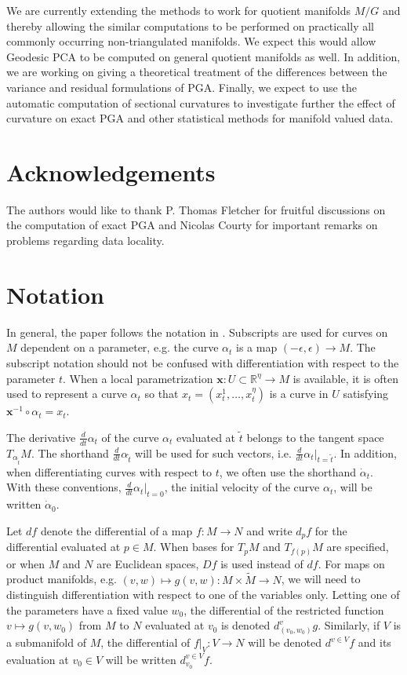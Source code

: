 \documentclass[final]{svjour3}
\newcommand{\RR}{\mathbb{R}}
\newcommand{\df}[2]{\tfrac{d}{d#2} #1}
\newcommand{\tm}{d}
\newcommand{\tmp}[1]{\tm^{#1}}
\newcommand{\param}[1]{\mathbf{#1}}
\begin{document}
We are currently extending the methods to work for quotient manifolds
$M/G$ and thereby allowing the similar computations to be performed on practically all
commonly occurring non-triangulated manifolds.
We expect this would allow Geodesic PCA to be computed on general 
quotient manifolds as well.
In addition, we are working on giving a theoretical treatment of the differences
between the variance and residual formulations of PGA. Finally, we
expect to use the automatic computation of sectional curvatures to investigate
further the effect of curvature on exact PGA and other 
statistical methods for manifold valued data.


\section*{Acknowledgements}
The authors would like to thank P. Thomas Fletcher for fruitful discussions on
the computation of exact PGA and Nicolas Courty for important remarks on
problems regarding data locality. 

\appendix

\section{Notation}
\label{app:notation}
In general, the paper follows the notation in \cite{do_carmo_riemannian_1992}.
Subscripts are used for curves on $M$ dependent on a parameter,
e.g. the curve $\alpha_t$ is a map $(-\epsilon,\epsilon)\rightarrow M$.
The subscript notation should 
not be confused with differentiation with respect to the parameter $t$.
When a local parametrization $\param{x}:U\subset\RR^\eta\rightarrow M$ is
available, it is often used to represent a
curve $\alpha_t$ so that $x_t=(x^1_t,\dots,x^\eta_t)$ is a curve in $U$ satisfying $\param{x}^{-1}\circ\alpha_t=x_t$.

The derivative $\df{\alpha_t}{t}$ of the curve $\alpha_t$
evaluated at $\tilde{t}$ belongs to the tangent space $T_{\alpha_{\tilde{t}}}M$.
The shorthand $\df{\alpha_{\tilde{t}}}{t}$ will be used for such vectors, i.e.
$\df{\alpha_t}{t}|_{t=\tilde{t}}$. In addition, when differentiating curves with
respect to $t$, we often use the shorthand $\dot{\alpha}_t$. With these conventions,
$\df{\alpha_t}{t}|_{t=0}$, the initial velocity of the curve $\alpha_t$, will be written
$\dot{\alpha}_0$.

Let $\tm f$ denote the differential of a map $f:M\to N$ and write $\tm_p f$ for
the differential evaluated at $p\in M$. When bases 
for $T_pM$ and $T_{f(p)}M$ are specified, or when $M$ and $N$ are Euclidean spaces, 
$Df$ is used instead of $df$.
For maps on product manifolds, e.g. $(v,w)\mapsto
g(v,w):M\times
\tilde{M}\to N$, we will need to distinguish differentiation with respect
to one of the variables only. Letting one of the parameters have a fixed value
$w_0$, the differential of the restricted function $v\mapsto g(v,w_0)$ from $M$
to $N$
evaluated at $v_0$ is denoted $\tm^v_{(v_0,w_0)} g$. Similarly, if $V$ is a submanifold of $M$, the differential
of $f|_V: V\to N$ will be denoted $\tmp{v\in V}f$ and its evaluation at $v_0\in V$ will
be written $\tmp{v\in V}_{v_0}f$.
\end{document}

